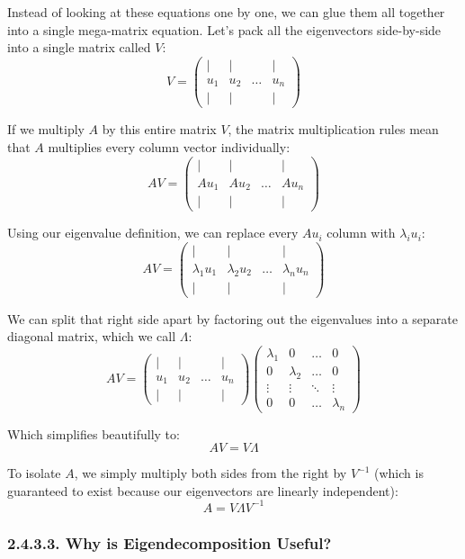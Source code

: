 \documentclass{article}
\begin{document}
Instead of looking at these equations one by one, we can glue them all together into a single mega-matrix equation. Let's pack all the eigenvectors side-by-side into a single matrix called $V$:
\[ V = \begin{pmatrix} | & | & & | \\ u_1 & u_2 & \dots & u_n \\ | & | & & | \end{pmatrix} \]

If we multiply $A$ by this entire matrix $V$, the matrix multiplication rules mean that $A$ multiplies every column vector individually:
\[ A V = \begin{pmatrix} | & | & & | \\ A u_1 & A u_2 & \dots & A u_n \\ | & | & & | \end{pmatrix} \]

Using our eigenvalue definition, we can replace every $A u_i$ column with $\lambda_i u_i$:
\[ A V = \begin{pmatrix} | & | & & | \\ \lambda_1 u_1 & \lambda_2 u_2 & \dots & \lambda_n u_n \\ | & | & & | \end{pmatrix} \]

We can split that right side apart by factoring out the eigenvalues into a separate diagonal matrix, which we call $\Lambda$:
\[ A V = \begin{pmatrix} | & | & & | \\ u_1 & u_2 & \dots & u_n \\ | & | & & | \end{pmatrix} \begin{pmatrix} \lambda_1 & 0 & \dots & 0 \\ 0 & \lambda_2 & \dots & 0 \\ \vdots & \vdots & \ddots & \vdots \\ 0 & 0 & \dots & \lambda_n \end{pmatrix} \]

Which simplifies beautifully to:
\[ AV = V\Lambda \]

To isolate $A$, we simply multiply both sides from the right by $V^{-1}$ (which is guaranteed to exist because our eigenvectors are linearly independent):
\[ A = V \Lambda V^{-1} \]

\subsubsection*{2.4.3.3. Why is Eigendecomposition Useful?}
\end{document}

